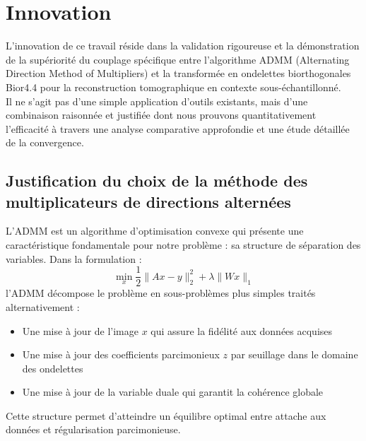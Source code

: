 \section{Innovation}
L'innovation de ce travail réside dans la validation rigoureuse et la démonstration de la supériorité du couplage spécifique entre l'algorithme ADMM (Alternating Direction Method of Multipliers) et la transformée en ondelettes biorthogonales Bior4.4 pour la reconstruction tomographique en contexte sous-échantillonné.\\
Il ne s'agit pas d'une simple application d'outils existants, mais d'une combinaison raisonnée et justifiée dont nous prouvons quantitativement l'efficacité à travers une analyse comparative approfondie et une étude détaillée de la convergence.
\subsection{Justification du choix de la méthode des multiplicateurs de directions alternées}
L'ADMM est un algorithme d'optimisation convexe qui présente une caractéristique fondamentale pour notre problème : sa structure de séparation des variables. Dans la formulation :
$$\min_{x} \frac{1}{2}\|Ax - y\|_2^2 + \lambda \|Wx\|_1$$
l'ADMM décompose le problème en sous-problèmes plus simples traités alternativement :
\begin{itemize}[label=-]
    \item Une mise à jour de l'image \(x\) qui assure la fidélité aux données acquises
    \item Une mise à jour des coefficients parcimonieux \(z\) par seuillage dans le domaine des ondelettes
    \item Une mise à jour de la variable duale qui garantit la cohérence globale
\end{itemize}
Cette structure permet d'atteindre un équilibre optimal entre attache aux données et régularisation parcimonieuse.
